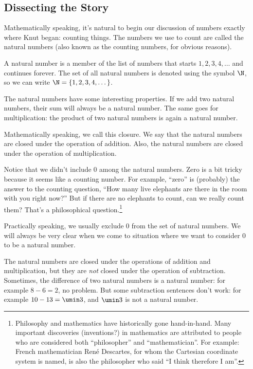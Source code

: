\subsection{Dissecting the Story}

Mathematically speaking, it's natural to begin our discussion of numbers exactly where Knut began: counting things. The numbers we use to count are called the natural numbers (also known as the counting numbers, for obvious reasons).

\begin{boxeddef}
A \gls{natural number} is a member of the list of numbers that starts $1, 2, 3, 4,\dotsc$ and continues forever. The set of all natural numbers is denoted using the symbol $\N$, so we can write $\N = \{1, 2, 3, 4, \dotsc\}$.
\end{boxeddef}

The natural numbers have some interesting properties. If we add two natural numbers, their sum will always be a natural number. The same goes for multiplication: the product of two natural numbers is again a natural number.

Mathematically speaking, we call this \gls{closure}. We say that the natural numbers are closed under the operation of addition. Also, the natural numbers are closed under the operation of multiplication.

Notice that we didn't include 0 among the natural numbers. Zero is a bit tricky because it seems like a counting number. For example, ``zero'' is (probably) the answer to the counting question, ``How many live elephants are there in the room with you right now?'' But if there are no elephants to count, can we really count them? That's a philosophical question.\footnote{Philosophy and mathematics have historically gone hand-in-hand. Many important discoveries (inventions?) in mathematics are attributed to people who are considered both ``philosopher'' and ``mathematician''. For example: French mathematician Ren\'{e} Descartes, for whom the Cartesian coordinate system is named, is also the philosopher who said ``I think therefore I am''.}

Practically speaking, we usually exclude 0 from the set of natural numbers. We will always be very clear when we come to situation where we want to consider 0 to be a natural number.

The natural numbers are closed under the operations of addition and multiplication, but they are {\em not} closed under the operation of subtraction. Sometimes, the difference of two natural numbers is a natural number: for example $8-6=2$, no problem. But some subtraction sentences don't work: for example $10-13 = \umin3$, and $\umin3$ is not a natural number.

